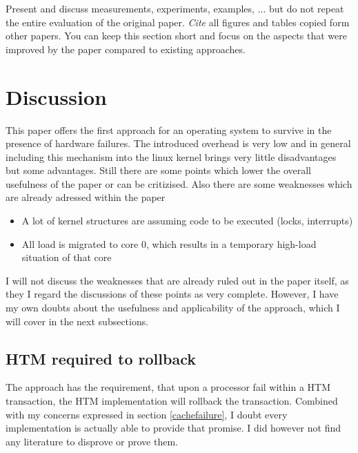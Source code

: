 \documentclass[a4paper,10pt,twoside]{article}
\begin{document}
Present and discuss measurements, experiments, examples, ... but do not repeat the entire evaluation of the original paper.
\emph{Cite} all figures and tables copied form other papers.
You can keep this section short and focus on the aspects that were improved by the paper compared to existing approaches.

\section{Discussion}

This paper offers the first approach for an operating system to survive in the presence of hardware failures. The introduced overhead is very low and in general including this mechanism into the linux kernel brings very little disadvantages but some advantages.
Still there are some points which lower the overall usefulness of the paper or can be critizised. Also there are some weaknesses which are already adressed within the paper
\begin{itemize}
	\item A lot of kernel structures are assuming code to be executed (locks, interrupts)
	\item All load is migrated to core 0, which results in a temporary high-load situation of that core
\end{itemize}

I will not discuss the weaknesses that are already ruled out in the paper itself, as they I regard the discussions of these points as very complete. However, I have my own doubts about the usefulness and applicability of the approach, which I will cover in the next subsections.

\subsection{HTM required to rollback}
The approach has the requirement, that upon a processor fail within a HTM transaction, the HTM implementation will rollback the transaction. Combined with my concerns expressed in section \ref{cachefailure}, I doubt every implementation is actually able to provide that promise. I did however not find any literature to disprove or prove them.

\end{document}
